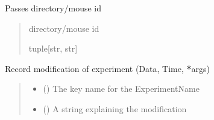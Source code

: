 \documentclass[letterpaper,10pt,english]{sphinxmanual}
\begin{document}
\begin{fulllineitems}
\begin{fulllineitems}
\begin{quote}
\begin{description}
\end{description}\end{quote}

\end{fulllineitems}


\begin{fulllineitems}
\label{\detokenize{Organization:Organization.Mouse.pass_meta}}
\pysigstartsignatures
{}
\pysigstopsignatures
\sphinxAtStartPar
Passes directory/mouse id
\begin{quote}\begin{description}
\sphinxAtStartPar
directory/mouse id

\sphinxAtStartPar
tuple{[}str, str{]}

\end{description}\end{quote}

\end{fulllineitems}


\begin{fulllineitems}
\label{\detokenize{Organization:Organization.Mouse.record_experiment_mod}}
\pysigstartsignatures
{}
\pysigstopsignatures
\sphinxAtStartPar
Record modification of experiment (Data, Time, {\color{red}\bfseries{}*}args)
\begin{quote}\begin{description}
\begin{itemize}
\item {} 
\sphinxAtStartPar
{} () \textendash{} The key name for the ExperimentName

\item {} 
\sphinxAtStartPar
{} () \textendash{} A string explaining the modification


\end{itemize}
\end{description}
\end{quote}
\end{fulllineitems}
\end{fulllineitems}
\end{document}
